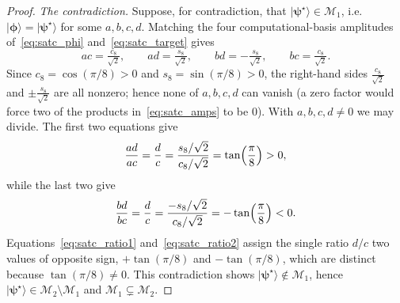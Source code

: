 \documentclass[11pt]{article}
\newcommand{\cM}{\mathcal{M}}
\theoremstyle{plain}
\theoremstyle{plain}
\begin{document}
\begin{proof}
\emph{The contradiction.} Suppose, for contradiction, that
$|\boldsymbol{\psi}^\star\rangle\in\cM_1$, i.e.\
$|\boldsymbol{\phi}\rangle=|\boldsymbol{\psi}^\star\rangle$ for some $a,b,c,d$. Matching
the four computational-basis amplitudes
of~\eqref{eq:satc_phi} and~\eqref{eq:satc_target} gives
\begin{equation}\label{eq:satc_amps}
  ac=\tfrac{c_8}{\sqrt2},\qquad
  ad=\tfrac{s_8}{\sqrt2},\qquad
  bd=-\tfrac{s_8}{\sqrt2},\qquad
  bc=\tfrac{c_8}{\sqrt2}.
\end{equation}
Since $c_8=\cos(\pi/8)>0$ and $s_8=\sin(\pi/8)>0$, the right-hand sides
$\tfrac{c_8}{\sqrt2}$ and $\pm\tfrac{s_8}{\sqrt2}$ are all nonzero;
hence none of $a,b,c,d$ can vanish (a zero factor would force two of
the products in~\eqref{eq:satc_amps} to be $0$). With $a,b,c,d\neq0$ we
may divide. The first two equations give
\begin{equation}\label{eq:satc_ratio1}
  \frac{ad}{ac}=\frac{d}{c}
  =\frac{s_8/\sqrt2}{c_8/\sqrt2}
  =\tan \Bigl(\frac\pi8\Bigr)>0,
\end{equation}
while the last two give
\begin{equation}\label{eq:satc_ratio2}
  \frac{bd}{bc}=\frac{d}{c}
  =\frac{-s_8/\sqrt2}{c_8/\sqrt2}
  =-\tan \Bigl(\frac\pi8\Bigr)<0.
\end{equation}
Equations~\eqref{eq:satc_ratio1} and~\eqref{eq:satc_ratio2} assign the
single ratio $d/c$ two values of opposite sign,
$+\tan(\pi/8)$ and $-\tan(\pi/8)$, which are distinct because
$\tan(\pi/8)\neq0$. This contradiction shows
$|\boldsymbol{\psi}^\star\rangle\notin\cM_1$, hence
$|\boldsymbol{\psi}^\star\rangle\in\cM_2\setminus\cM_1$ and
$\cM_1\subsetneq\cM_2$.


\end{proof}
\end{document}
